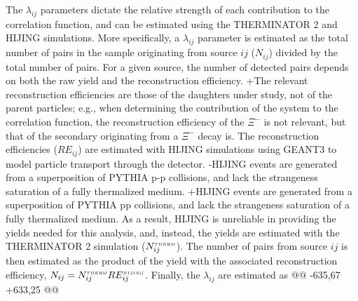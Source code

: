  The $\lambda_{ij}$ parameters dictate the relative strength of each contribution to the correlation function, and can be estimated using the THERMINATOR 2 and HIJING simulations.
 More specifically, a $\lambda_{ij}$ parameter is estimated as the total number of \LamK pairs in the sample originating from source $ij$ ($N_{ij}$) divided by the total number of \LamK pairs.
 For a given \LamK source, the number of detected pairs depends on both the raw yield and the reconstruction efficiency.
+The relevant reconstruction efficiencies are those of the daughters under study, not of the parent particles; e.g., when determining the contribution of the \XiKchP system to the \LamKchP correlation function, the reconstruction efficiency of the $\Xi^{-}$ is not relevant, but that of the secondary \Lam originating from a $\Xi^{-}$ decay is. 
 The reconstruction efficiencies ($RE_{ij}$) are estimated with HIJING simulations using GEANT3 to model particle transport through the detector.
-HIJING events are generated from a superposition of PYTHIA p-p collisions, and lack the strangeness saturation of a fully thermalized medium.
+HIJING events are generated from a superposition of PYTHIA pp collisions, and lack the strangeness saturation of a fully thermalized medium.
 As a result, HIJING is unreliable in providing the yields needed for this analysis, and, instead, the yields are estimated with the THERMINATOR 2 simulation ($N_{ij}^{\scaleto{THERM}{3pt}}$).
 The number of \LamK pairs from source $ij$ is then estimated as the product of the yield with the associated reconstruction efficiency, $N_{ij} = N_{ij}^{\scaleto{THERM}{3pt}}RE_{ij}^{\scaleto{HIJING}{3pt}}$.
 Finally, the $\lambda_{ij}$ are estimated as
@@ -635,67 +633,25 @@
 
